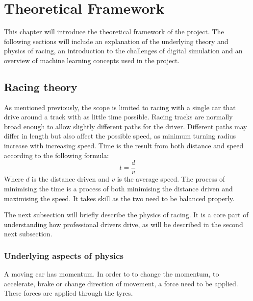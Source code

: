 \chapter{Theoretical Framework}
This chapter will introduce the theoretical framework of the project. The following sections will include an explanation of the underlying theory and physics of racing, an introduction to the challenges of digital simulation and an overview of machine learning concepts used in the project. 

\section{Racing theory}

As mentioned previously, the scope is limited to racing with a single car that drive around a track with as little time possible. Racing tracks are normally broad enough to allow slightly different paths for the driver. Different paths may differ in length but also affect the possible speed, as minimum turning radius increase with increasing speed. Time is the result from both distance and speed according to the following formula:
\begin{equation}
t = \frac{d}{v}
\end{equation}
Where $d$ is the distance driven and $v$ is the average speed. The process of minimising the time is a process of both minimising the distance driven and maximising the speed. It takes skill as the two need to be balanced properly.

The next subsection will briefly describe the physics of racing. It is a core part of understanding how professional drivers drive, as will be described in the second next subsection.

\subsection{Underlying aspects of physics}
A moving car has momentum. In order to to change the momentum, to accelerate, brake or change direction of movement, a force need to be applied. These forces are applied through the tyres. 

